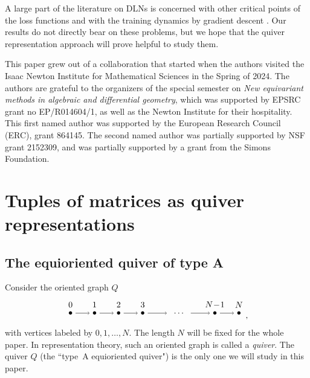 \documentclass[a4paper]{amsart}
\theoremstyle{plain}
\begin{document}
A large part of the literature on DLNs is concerned with other critical points of the loss functions \cite{kawaguchi:DLN_no_local_min,kawaguchi-lu:DLN_no_local_min_II,achour-al:DLN_landscape_Hessian} and with the training dynamics by gradient descent \cite{Liu-Li-Meng:exact_DLN,ji-telgarsky:GD-DLN,saxe-al:exact-dynamics-DLN,arora-al:convergence_GD_DLN,saxe-mcclellang-ganguli:DLN,jacot-al:saddle-to-saddle-DLN,marion-chizat:DLN-flat-minima}. Our results do not directly bear on these problems, but we hope that the quiver representation approach will prove helpful to study them.

\bigskip

This paper grew out of a collaboration that started when the authors visited the Isaac Newton Institute for Mathematical Sciences in the Spring of 2024. The authors are grateful to the organizers of the special semester on {\em New equivariant methods in algebraic and differential geometry}, which was supported by EPSRC grant no EP/R014604/1, as well as the Newton Institute for their hospitality. This first named author was supported by the European Research Council (ERC), grant 864145. The second named author was partially supported by NSF grant 2152309, and was partially supported by a grant from the Simons Foundation. 


\section{Tuples of matrices as quiver representations}
\label{secQG}
\subsection{The equioriented quiver of type A}



Consider the oriented graph $Q$ 
\[
\begin{tikzpicture}
 \node (A0) at (0,0)   {$\bullet$};
 \node (A1) at (1,0)   {$\bullet$};
 \node (A2) at (2,0)   {$\bullet$};
 \node (A3) at (3,0)   {$\bullet$};
 \node at (4.5,0)   {$\ldots$};
 \node (A6) at (6,0)   {$\bullet$};
 \node (A7) at (7,0)   {$\bullet$};
 \draw[->] (A0) to (A1);
 \draw[->] (A1) to (A2);
 \draw[->] (A2) to (A3);
 \draw[->] (A3) to (4,0);
 \draw[->] (5,0) to (A6);
 \draw[->] (A6) to (A7);
 \node at (0,.35) {$0$};
 \node at (1,.35) {$1$};
 \node at (2,.35) {$2$};
 \node at (3,.35) {$3$};
 \node at (6,.35) {$N\!-\!1$};
 \node at (7,.35) {$N$};
\end{tikzpicture},
\]
 with vertices labeled by $0,1,\ldots,N$. The length $N$ will be fixed for the whole paper. In representation theory, such an oriented graph is called a {\em quiver}. The quiver $Q$ (the ``type~A equioriented quiver") is the only one we will study in this paper.
\end{document}
